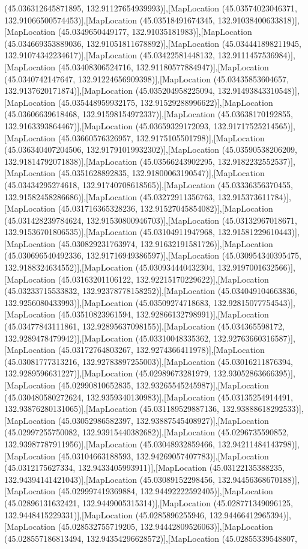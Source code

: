 (45.036312645871895, 132.91127654939993)],[MapLocation (45.03574023046371, 132.91066500574453)],[MapLocation (45.03518491674345, 132.91038400633818)],[MapLocation (45.0349650449177, 132.91035181983)],[MapLocation (45.034669353889036, 132.91051811678892)],[MapLocation (45.034441898211945, 132.91074342234617)],[MapLocation (45.03422581448132, 132.9111457536984)],[MapLocation (45.03408306524716, 132.91180577884947)],[MapLocation (45.0340742147647, 132.91224656909398)],[MapLocation (45.03435853604657, 132.9137620171874)],[MapLocation (45.035204958225094, 132.91493843310548)],[MapLocation (45.035448959932175, 132.91529288996622)],[MapLocation (45.03606639618468, 132.91598154972337)],[MapLocation (45.03638170192855, 132.9163393864467)],[MapLocation (45.03659329172093, 132.91717525214565)],[MapLocation (45.03660576326957, 132.9175105501798)],[MapLocation (45.036340407204506, 132.91791019932302)],[MapLocation (45.03590538206209, 132.91814792071838)],[MapLocation (45.03566243902295, 132.9182232552537)],[MapLocation (45.0351628892835, 132.91800063190547)],[MapLocation (45.03434295274618, 132.91740708618565)],[MapLocation (45.03336356370455, 132.91582458286686)],[MapLocation (45.03272911356763, 132.915373611784)],[MapLocation (45.031716365328236, 132.91527045854082)],[MapLocation (45.031428239784624, 132.91530800946703)],[MapLocation (45.03132967018671, 132.91536701806535)],[MapLocation (45.03104911947968, 132.91581229610443)],[MapLocation (45.030829231763974, 132.91632191581726)],[MapLocation (45.030696540492336, 132.91716949386597)],[MapLocation (45.030954340395475, 132.9188324634552)],[MapLocation (45.030934440432304, 132.9197001632566)],[MapLocation (45.03163201106122, 132.92215170229622)],[MapLocation (45.03233715533832, 132.92378778158252)],[MapLocation (45.034049104663836, 132.9256080433993)],[MapLocation (45.03509274718683, 132.92815077754543)],[MapLocation (45.03510823961594, 132.92866132798991)],[MapLocation (45.03477843111861, 132.92895637098155)],[MapLocation (45.034365598172, 132.9289478479942)],[MapLocation (45.03310048335362, 132.92763660316587)],[MapLocation (45.03172764803267, 132.9274366411978)],[MapLocation (45.03081777313216, 132.92783897255003)],[MapLocation (45.03016211876394, 132.9289596631227)],[MapLocation (45.02989673281979, 132.93052863666395)],[MapLocation (45.02990810652835, 132.93265545245987)],[MapLocation (45.030480580272624, 132.9359340130983)],[MapLocation (45.03135254914491, 132.93876280131065)],[MapLocation (45.031189529887136, 132.93888618292533)],[MapLocation (45.03052986582397, 132.93887545408927)],[MapLocation (45.02997255750082, 132.93915440382682)],[MapLocation (45.0296735590852, 132.93987787911956)],[MapLocation (45.03048932859466, 132.94211484143798)],[MapLocation (45.03104663188593, 132.94269057407783)],[MapLocation (45.0312175627334, 132.9433405993911)],[MapLocation (45.03122135388235, 132.94394141421043)],[MapLocation (45.03089152298456, 132.94456368670188)],[MapLocation (45.029997419369884, 132.94492222592405)],[MapLocation (45.02896131632421, 132.9449005315314)],[MapLocation (45.028771349096125, 132.9448415229331)],[MapLocation (45.0285896255946, 132.94466412965394)],[MapLocation (45.028532755719205, 132.94442809526063)],[MapLocation (45.028557186813494, 132.94354296628572)],[MapLocation (45.02855339548807, 